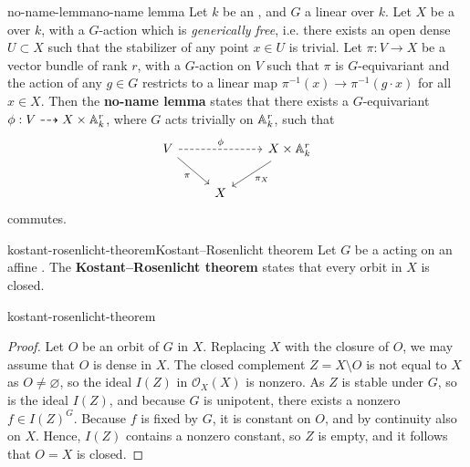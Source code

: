 \begin{topic}{no-name-lemma}{no-name lemma}
    Let $k$ be an , and $G$ a linear  over $k$. Let $X$ be a  over $k$, with a $G$-action which is \textit{generically free}, i.e. there exists an open dense $U \subset X$ such that the stabilizer of any point $x \in U$ is trivial. Let $\pi : V \to X$ be a vector bundle of rank $r$, with a $G$-action on $V$ such that $\pi$ is $G$-equivariant and the action of any $g \in G$ restricts to a linear map $\pi^{-1}(x) \to \pi^{-1}(g \cdot x)$ for all $x \in X$. Then the \textbf{no-name lemma} states that there exists a $G$-equivariant  $\phi : V \dashrightarrow X \times \AA^r_k$, where $G$ acts trivially on $\AA^r_k$, such that
    \[ \begin{tikzcd}
        V \arrow[dashed]{rr}{\phi} \arrow[swap]{rd}{\pi} && X \times \AA^r_k \arrow{dl}{\pi_X} \\
        & X &
    \end{tikzcd} \]
    commutes.
\end{topic}

\begin{topic}{kostant-rosenlicht-theorem}{Kostant--Rosenlicht theorem}
    Let $G$ be a  acting on an affine . The \textbf{Kostant--Rosenlicht theorem} states that every orbit in $X$ is closed.
\end{topic}

\begin{example}{kostant-rosenlicht-theorem}
    \begin{proof}
        Let $O$ be an orbit of $G$ in $X$. Replacing $X$ with the closure of $O$, we may assume that $O$ is dense in $X$. The closed complement $Z = X \setminus O$ is not equal to $X$ as $O \ne \varnothing$, so the ideal $I(Z)$ in $\mathcal{O}_X(X)$ is nonzero. As $Z$ is stable under $G$, so is the ideal $I(Z)$, and because $G$ is unipotent, there exists a nonzero $f \in I(Z)^G$. Because $f$ is fixed by $G$, it is constant on $O$, and by continuity also on $X$. Hence, $I(Z)$ contains a nonzero constant, so $Z$ is empty, and it follows that $O = X$ is closed.
    \end{proof}
\end{example}


